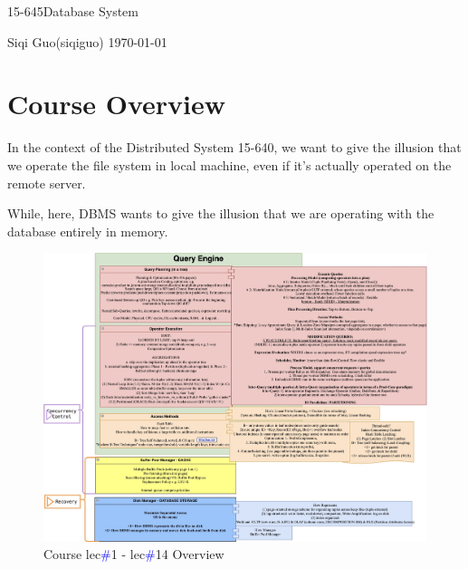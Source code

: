 \documentclass[letterpaper,11pt]{exam}
\newcommand{\coursenum}{15-645\quad}
\newcommand{\coursename}{\coursenum Database System}
\newcommand{\fullname}{Siqi Guo}
\newcommand{\andrew}{siqiguo}
\begin{document}
\begin{center}
    {\LARGE\coursename\par}
    \fullname \quad (\andrew) \hfill \today
\end{center}

\section*{Course Overview}


In the context of the Distributed System 15-640, we want to give the illusion that we operate the file system in local machine, even if it's actually operated on the remote server.

While, here, DBMS wants to give the illusion that we are operating with the database entirely in memory.

\vspace*{1em}
\begin{figure}[h]
  \hspace{-40pt}
  \includegraphics[width=1.15\textwidth]{../diagram/course-notes.jpg}
  \caption{Course lec{\footnotesize\textcolor{blue}{\#}}1 - lec{\footnotesize\textcolor{blue}{\#}}14 Overview}
\end{figure}


\end{document}
